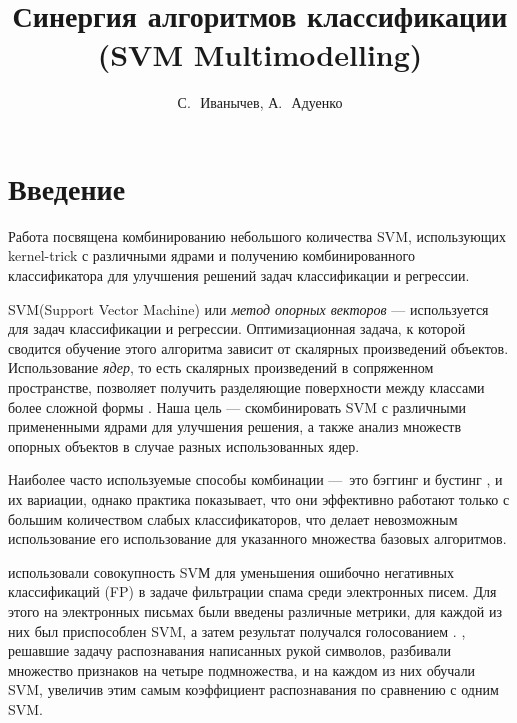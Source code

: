 \documentclass[12pt,twoside]{article}
\title
    {Синергия алгоритмов классификации (SVM Multimodelling)}
\author
    {С.\,~Иванычев, А.\,~Адуенко}
\theoremstyle{plain}
\theoremstyle{remark}
\theoremstyle{definition}
\begin{document}
\maketitle

\section{Введение}
Работа посвящена комбинированию небольшого количества SVM, использующих kernel-trick с различными ядрами и получению комбинированного классификатора для улучшения решений задач классификации и регрессии.

    SVM(Support Vector Machine) или \emph{метод опорных векторов}\cite{Cortes1995, Boser1992} --- используется для задач классификации и регрессии. Оптимизационная задача, к которой сводится обучение этого алгоритма зависит от скалярных произведений объектов. Использование  \emph{ядер}, то есть скалярных произведений в сопряженном пространстве, позволяет получить разделяющие поверхности между классами более сложной формы \cite{Smola2004}. Наша цель --- скомбинировать SVM
    с различными примененными ядрами для улучшения решения, а также анализ множеств опорных объектов в случае разных использованных ядер.

    Наиболее часто используемые способы комбинации ---~это
    бэггинг \cite{Breiman1996} и бустинг \cite{Freund1995}, и их
    вариации, однако практика показывает, что они эффективно работают только с  большим количеством слабых классификаторов, что делает невозможным использование его использование для указанного множества базовых алгоритмов.


    \cite{Martin-merino2007} использовали совокупность SVМ для уменьшения ошибочно негативных классификаций (FP) в задаче фильтрации спама среди электронных писем.
    Для этого на электронных письмах были введены различные метрики, для каждой из них был приспособлен SVM, а затем результат получался голосованием \cite{Kittler1996}.
    \cite{Gorgevik2005}, решавшие задачу распознавания написанных рукой символов, разбивали множество признаков на четыре  подмножества, и на каждом из них обучали SVM, увеличив этим самым коэффициент распознавания по сравнению с одним SVM.
\end{document}
